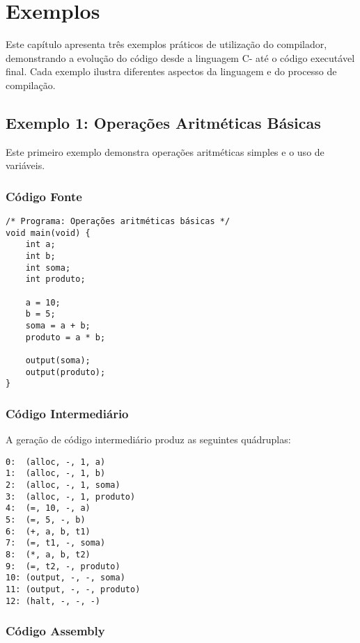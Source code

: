 \documentclass[
	12pt,				%
	oneside,
	a4paper,			%
	english,			%
	french,				%
	spanish,			%
	brazil,				%
	]{abntex2}
\begin{document}
\chapter{Exemplos}

Este capítulo apresenta três exemplos práticos de utilização do compilador, demonstrando a evolução do código desde a linguagem C- até o código executável final. Cada exemplo ilustra diferentes aspectos da linguagem e do processo de compilação.

\section{Exemplo 1: Operações Aritméticas Básicas}

Este primeiro exemplo demonstra operações aritméticas simples e o uso de variáveis.

\subsection{Código Fonte}

\begin{lstlisting}[style=cstyle, caption=Exemplo 1: Código fonte C-]
/* Programa: Operações aritméticas básicas */
void main(void) {
    int a;
    int b;
    int soma;
    int produto;
    
    a = 10;
    b = 5;
    soma = a + b;
    produto = a * b;
    
    output(soma);
    output(produto);
}
\end{lstlisting}

\subsection{Código Intermediário}

A geração de código intermediário produz as seguintes quádruplas:

\begin{lstlisting}[style=cstyle, caption=Exemplo 1: Código intermediário (quádruplas)]
0:  (alloc, -, 1, a)
1:  (alloc, -, 1, b)  
2:  (alloc, -, 1, soma)
3:  (alloc, -, 1, produto)
4:  (=, 10, -, a)
5:  (=, 5, -, b)
6:  (+, a, b, t1)
7:  (=, t1, -, soma)
8:  (*, a, b, t2)
9:  (=, t2, -, produto)
10: (output, -, -, soma)
11: (output, -, -, produto)
12: (halt, -, -, -)
\end{lstlisting}

\subsection{Código Assembly}
\end{document}
